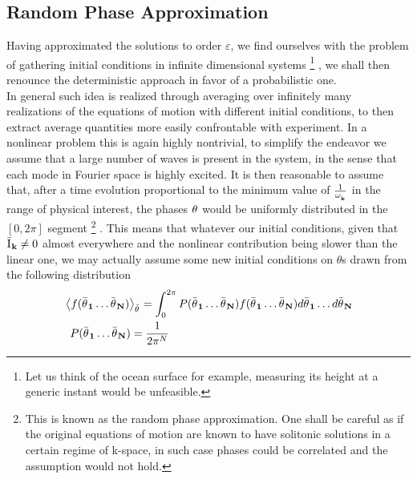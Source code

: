 \subsection{Random Phase Approximation}

Having approximated the solutions to order $\varepsilon$, we find ourselves with the problem of gathering 
initial conditions in infinite dimensional systems
\footnote{Let us think of the ocean surface for example, measuring its height at a generic instant would be unfeasible.}
, we shall then renounce the deterministic approach in favor of 
a probabilistic one.\\
In general such idea is realized through averaging over infinitely many realizations of the equations of motion with different initial conditions, to then extract 
average quantities more easily confrontable with experiment. In a nonlinear problem this is again highly nontrivial, to simplify the endeavor we assume that
a large number of waves is present in the system, in the sense that each mode in Fourier space is highly excited. It is then reasonable to assume that, after a time
evolution proportional to the minimum value of $\frac{1}{\omega^{}_{\mathbf{k}}}$ in the range of physical interest, the phases $\theta^{}$ would be uniformly distributed in the $\left[0,2\pi\right]$ segment 
\footnote{This is known as the random phase approximation. One shall be careful as if the original equations of motion are known to have solitonic solutions in a certain regime of k-space, 
in such case phases could be correlated and the assumption would not hold.}
. This means that whatever our initial conditions, given that $\bar{\mathrm{I}^{}}_\mathbf{k} \neq 0$ almost everywhere and the nonlinear contribution being slower than the linear one,
we may actually assume some new initial conditions on $\theta$s drawn from the following distribution
\begin{equation}
    \begin{aligned}
    &\left\langle f(\bar{\theta^{}}_\mathbf{1} \dots \bar{\theta^{}}_\mathbf{N}) \right\rangle_{\bar{\theta}^{}} = 
    \int_{0}^{2\pi} P(\bar{\theta^{}}_\mathbf{1} \dots \bar{\theta^{}}_\mathbf{N})f(\bar{\theta^{}}_\mathbf{1} \dots 
    \bar{\theta^{}}_\mathbf{N}) d\bar{\theta^{}}_\mathbf{1} \dots d\bar{\theta^{}}_\mathbf{N} 
     \\
    & \hspace{2mm} P(\bar{\theta^{}}_\mathbf{1} \dots \bar{\theta^{}}_\mathbf{N}) = \frac{1}{2\pi^{N}}
    \end{aligned}
\end{equation}


